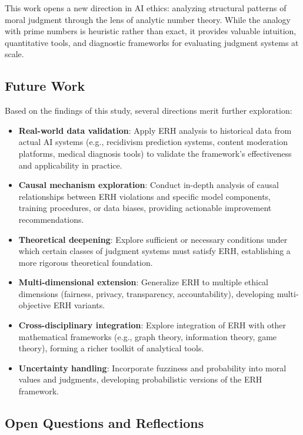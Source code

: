 \documentclass[12pt,a4paper]{article}
\theoremstyle{definition}
\theoremstyle{remark}
\begin{document}
This work opens a new direction in AI ethics: analyzing structural patterns of moral judgment through the lens of analytic number theory. While the analogy with prime numbers is heuristic rather than exact, it provides valuable intuition, quantitative tools, and diagnostic frameworks for evaluating judgment systems at scale.

\subsection{Future Work}

Based on the findings of this study, several directions merit further exploration:

\begin{itemize}
    \item \textbf{Real-world data validation}: Apply ERH analysis to historical data from actual AI systems (e.g., recidivism prediction systems, content moderation platforms, medical diagnosis tools) to validate the framework's effectiveness and applicability in practice.
    \item \textbf{Causal mechanism exploration}: Conduct in-depth analysis of causal relationships between ERH violations and specific model components, training procedures, or data biases, providing actionable improvement recommendations.
    \item \textbf{Theoretical deepening}: Explore sufficient or necessary conditions under which certain classes of judgment systems must satisfy ERH, establishing a more rigorous theoretical foundation.
    \item \textbf{Multi-dimensional extension}: Generalize ERH to multiple ethical dimensions (fairness, privacy, transparency, accountability), developing multi-objective ERH variants.
    \item \textbf{Cross-disciplinary integration}: Explore integration of ERH with other mathematical frameworks (e.g., graph theory, information theory, game theory), forming a richer toolkit of analytical tools.
    \item \textbf{Uncertainty handling}: Incorporate fuzziness and probability into moral values and judgments, developing probabilistic versions of the ERH framework.
\end{itemize}

\subsection{Open Questions and Reflections}
\end{document}
